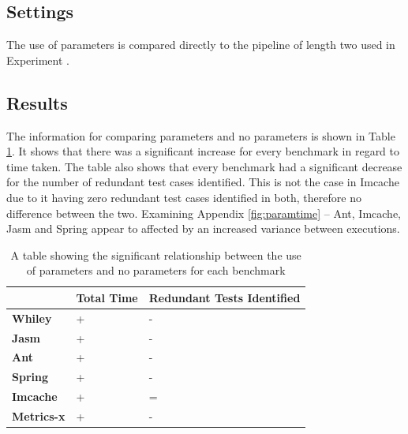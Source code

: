 \documentclass[11pt
              , a4paper
              , twoside
              , openright
              ]{report}
\newcommand{\rom}[1]{\uppercase\expandafter{\romannumeral #1\relax}}
\begin{document}
\subsection{Settings}
The use of parameters is compared directly to the pipeline of length two used in Experiment \rom{1}.

\subsection{Results}
The information for comparing parameters and no parameters is shown in Table \ref{parametersig}. It shows that there was a significant increase for every benchmark in regard to time taken. The table also shows that every benchmark had a significant decrease for the number of redundant test cases identified. This is not the case in Imcache due to it having zero redundant test cases identified in both, therefore no difference between the two. Examining Appendix \ref{fig:paramtime} -- Ant, Imcache, Jasm and Spring appear to affected by an increased variance between executions.

\begin{table}[h]
\centering
\begin{tabular}{|l|l|l|}
\hline
{\bf }          & {\bf Total Time} & {\bf Redundant Tests Identified} \\ \hline
{\bf Whiley}    & +                & -                           \\ \hline
{\bf Jasm}      & +               & -                          \\ \hline
{\bf Ant}       & +                & -                           \\ \hline
{\bf Spring}    & +                & -                           \\ \hline
{\bf Imcache}   & +                & =                           \\ \hline
{\bf Metrics-x} & +                & -                           \\ \hline
\end{tabular}
\caption{A table showing the significant relationship between the use of parameters and no parameters for each benchmark}
\label{parametersig}
\end{table}
\end{document}
